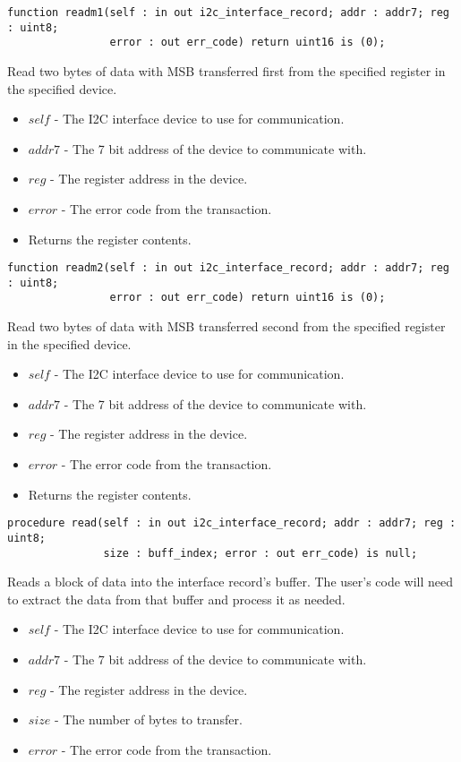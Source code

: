 \documentclass[10pt, openany]{book}
\newcommand{\indexfunc}[1]{\index[func]{#1}}
\begin{document}
\begin{lstlisting}
function readm1(self : in out i2c_interface_record; addr : addr7; reg : uint8;
                error : out err_code) return uint16 is (0);
\end{lstlisting}
\indexfunc{readm1}
Read two bytes of data with MSB transferred first from the specified register in the specified device.
\begin{itemize}
  \item $self$ - The I2C interface device to use for communication.
  \item $addr7$ - The 7 bit address of the device to communicate with.
  \item $reg$ - The register address in the device.
  \item $error$ - The error code from the transaction.
  \item Returns the register contents.
\end{itemize}

\begin{lstlisting}
function readm2(self : in out i2c_interface_record; addr : addr7; reg : uint8;
                error : out err_code) return uint16 is (0);
\end{lstlisting}
\indexfunc{readm2}
Read two bytes of data with MSB transferred second from the specified register in the specified device.
\begin{itemize}
  \item $self$ - The I2C interface device to use for communication.
  \item $addr7$ - The 7 bit address of the device to communicate with.
  \item $reg$ - The register address in the device.
  \item $error$ - The error code from the transaction.
  \item Returns the register contents.
\end{itemize}

\begin{lstlisting}
procedure read(self : in out i2c_interface_record; addr : addr7; reg : uint8;
               size : buff_index; error : out err_code) is null;
\end{lstlisting}
\indexfunc{read}
Reads a block of data into the interface record's buffer.  The user's code will need to extract the data from that buffer and process it as needed.
\begin{itemize}
  \item $self$ - The I2C interface device to use for communication.
  \item $addr7$ - The 7 bit address of the device to communicate with.
  \item $reg$ - The register address in the device.
  \item $size$ - The number of bytes to transfer.
  \item $error$ - The error code from the transaction.
\end{itemize}
\end{document}
